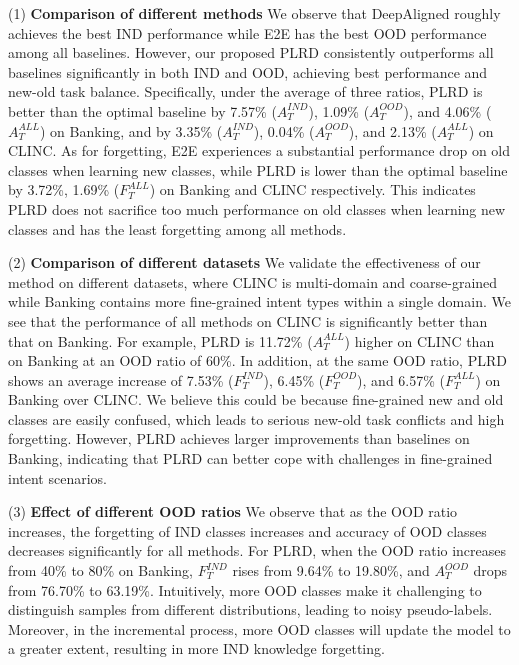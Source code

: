 \documentclass[11pt]{article}
\begin{document}
(1) \textbf{Comparison of different methods} We observe that DeepAligned roughly achieves the best IND performance while E2E has the best OOD performance among all baselines. However, our proposed PLRD consistently outperforms all baselines significantly in both IND and OOD, achieving best performance and new-old task balance. Specifically, under the average of three ratios, PLRD is better than the optimal baseline by 7.57\% ($A^{IND}_T$), 1.09\% ($A^{OOD}_T$), and 4.06\% ($A^{ALL}_T$) on Banking, and by 3.35\% ($A^{IND}_T$), 0.04\% ($A^{OOD}_T$), and 2.13\% ($A^{ALL}_T$) on CLINC. As for forgetting, E2E experiences a substantial performance drop on old classes when learning new classes, while PLRD is lower than the optimal baseline by 3.72\%, 1.69\% ($F^{ALL}_T$) on Banking and CLINC respectively. This indicates PLRD does not sacrifice too much performance on old classes when learning new classes and has the least forgetting among all methods.


(2) \textbf{Comparison of different datasets} We validate the effectiveness of our method on different datasets, where CLINC is multi-domain and coarse-grained while Banking contains more fine-grained intent types within a single domain. We see that the performance of all methods on CLINC is significantly better than that on Banking. For example, PLRD is 11.72\% ($A^{ALL}_T$) higher on CLINC than on Banking at an OOD ratio of 60\%. In addition, at the same OOD ratio, PLRD shows an average increase of 7.53\% ($F^{IND}_T$), 6.45\% ($F^{OOD}_T$), and 6.57\% ($F^{ALL}_T$) on Banking over CLINC. We believe this could be because fine-grained new and old classes are easily confused, which leads to serious new-old task conflicts and high forgetting. However, PLRD achieves larger improvements than baselines on Banking, indicating that PLRD can better cope with challenges in fine-grained intent scenarios.

(3) \textbf{Effect of different OOD ratios} %
We observe that as the OOD ratio increases, the forgetting of IND classes increases and accuracy of OOD classes decreases significantly for all methods. For PLRD, when the OOD ratio increases from 40\% to 80\% on Banking, $F^{IND}_T$ rises from 9.64\% to 19.80\%, and  $A^{OOD}_T$ drops from 76.70\% to 63.19\%. Intuitively, more OOD classes make it challenging to distinguish samples from different distributions, leading to noisy pseudo-labels. Moreover, in the incremental process, more OOD classes will update the model to a greater extent, resulting in more IND knowledge forgetting.
\end{document}
